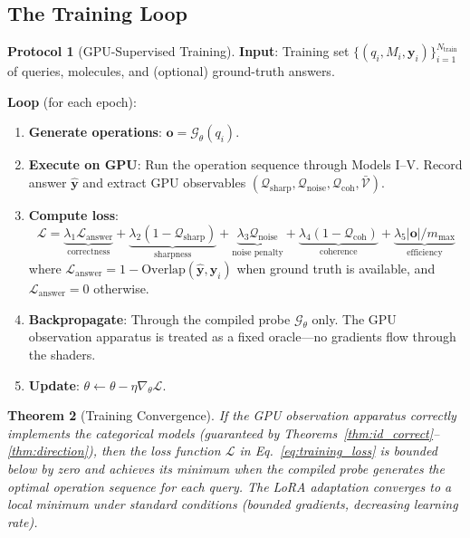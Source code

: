 \documentclass[11pt,twocolumn,a4paper]{article}
\newtheorem{theorem}{Theorem}[section]
\theoremstyle{definition}
\newtheorem{protocol}[theorem]{Protocol}
\theoremstyle{remark}
\newcommand{\Loss}{\mathcal{L}}
\begin{document}
\subsection{The Training Loop}

\begin{protocol}[GPU-Supervised Training]
\label{prot:gpu_training}
\textbf{Input}: Training set $\{(q_i, M_i, \mathbf{y}_i)\}_{i=1}^{N_{\mathrm{train}}}$ of queries, molecules, and (optional) ground-truth answers.

\textbf{Loop} (for each epoch):
\begin{enumerate}[nosep]
\item \textbf{Generate operations}: $\mathbf{o} = \mathcal{G}_\theta(q_i)$.
\item \textbf{Execute on GPU}: Run the operation sequence through Models I--V. Record answer $\hat{\mathbf{y}}$ and extract GPU observables $(\mathcal{Q}_{\mathrm{sharp}}, \mathcal{Q}_{\mathrm{noise}}, \mathcal{Q}_{\mathrm{coh}}, \bar{\mathcal{V}})$.
\item \textbf{Compute loss}:
\begin{equation}
\Loss = \underbrace{\lambda_1 \Loss_{\mathrm{answer}}}_{\text{correctness}} + \underbrace{\lambda_2 (1 - \mathcal{Q}_{\mathrm{sharp}})}_{\text{sharpness}} + \underbrace{\lambda_3 \mathcal{Q}_{\mathrm{noise}}}_{\text{noise penalty}} + \underbrace{\lambda_4 (1 - \mathcal{Q}_{\mathrm{coh}})}_{\text{coherence}} + \underbrace{\lambda_5 |\mathbf{o}|/m_{\max}}_{\text{efficiency}}
\label{eq:training_loss}
\end{equation}
where $\Loss_{\mathrm{answer}} = 1 - \mathrm{Overlap}(\hat{\mathbf{y}}, \mathbf{y}_i)$ when ground truth is available, and $\Loss_{\mathrm{answer}} = 0$ otherwise.
\item \textbf{Backpropagate}: Through the compiled probe $\mathcal{G}_\theta$ only. The GPU observation apparatus is treated as a fixed oracle---no gradients flow through the shaders.
\item \textbf{Update}: $\theta \leftarrow \theta - \eta \nabla_\theta \Loss$.
\end{enumerate}
\end{protocol}

\begin{theorem}[Training Convergence]
\label{thm:training_convergence}
If the GPU observation apparatus correctly implements the categorical models (guaranteed by Theorems~\ref{thm:id_correct}--\ref{thm:direction}), then the loss function $\Loss$ in Eq.~\eqref{eq:training_loss} is bounded below by zero and achieves its minimum when the compiled probe generates the optimal operation sequence for each query. The LoRA adaptation converges to a local minimum under standard conditions (bounded gradients, decreasing learning rate).
\end{theorem}
\end{document}
